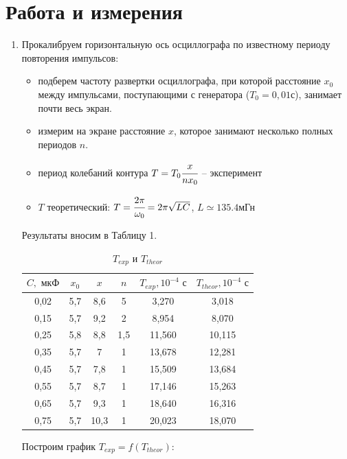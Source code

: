 \documentclass[a4paper, 12pt]{article}
\begin{document}
\section{Работа и измерения}
\begin{enumerate}
	\item Прокалибруем горизонтальную ось осциллографа по известному периоду повторения импульсов:
	\begin{itemize}
		\item подберем частоту развертки осциллографа, при которой расстояние $x_0$ между импульсами, поступающими с генератора ($T_0 = 0,01$с), занимает почти весь экран.
		\item измерим на экране расстояние $x$, которое занимают несколько полных периодов $n$.
		\item период колебаний контура $T = T_0\cfrac{x}{nx_0}$ -- эксперимент
		\item $T$ теоретический: $T = \cfrac{2\pi}{\omega_0} = 2\pi\sqrt{LC}$, $L\simeq135.4 \text{мГн}$
	\end{itemize}
	Результаты вносим в Таблицу 1.
	\begin{table}[H]
		\centering
		\begin{tabular}{|c|c|c|c|c|c|}
			\hline
			$C, \text{ мкФ}$ & $x_0$ & $x$ & $n$ & $T_{exp}, 10^{-4}\text{ с}$ & $T_{theor}, 10^{-4}\text{ с}$ \\ \hline
		0,02&	5,7&	8,6&	5&	3,270&	3,018  \\ \hline
		0,15&	5,7&	9,2&	2&	8,954&	8,070  \\ \hline
		0,25&	5,8&	8,8&	1,5&	11,560&	10,115  \\ \hline
		0,35&	5,7&	7&	1	&13,678	&12,281  \\ \hline
		0,45&	5,7&	7,8&	1&	15,509&	13,684  \\ \hline
		0,55&	5,7&	8,7&	1&	17,146&	15,263  \\ \hline
		0,65&	5,7&	9,3&	1&	18,640&	16,316  \\ \hline
		0,75&	5,7&	10,3&	1&	20,023&	18,070  \\ \hline
		\end{tabular}
		\caption{$T_{exp}$ и $T_{theor}$}
	\end{table}
	Построим график $T_{exp}=f(T_{theor})$:
	

\end{enumerate}
\end{document}

